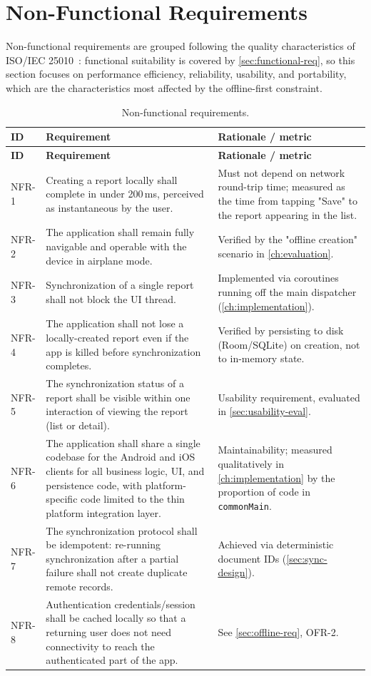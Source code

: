 \section{Non-Functional Requirements}
\label{sec:nonfunctional-req}

Non-functional requirements are grouped following the quality
characteristics of ISO/IEC 25010~\cite{iso25010}: functional suitability
is covered by \cref{sec:functional-req}, so this section focuses on
performance efficiency, reliability, usability, and portability, which are
the characteristics most affected by the offline-first constraint.

\begin{longtable}{@{}p{1.4cm}p{5.4cm}p{5.0cm}@{}}
\caption{Non-functional requirements.}
\label{tab:nonfunctional-req}\\
\toprule
\textbf{ID} & \textbf{Requirement} & \textbf{Rationale / metric} \\
\midrule
\endfirsthead
\toprule
\textbf{ID} & \textbf{Requirement} & \textbf{Rationale / metric} \\
\midrule
\endhead
NFR-1 & Creating a report locally shall complete in under 200\,ms,
perceived as instantaneous by the user. & Must not depend on network
round-trip time; measured as the time from tapping "Save" to the report
appearing in the list. \\
NFR-2 & The application shall remain fully navigable and operable with the
device in airplane mode. & Verified by the "offline creation" scenario in
\cref{ch:evaluation}. \\
NFR-3 & Synchronization of a single report shall not block the UI thread.
& Implemented via coroutines running off the main dispatcher
(\cref{ch:implementation}). \\
NFR-4 & The application shall not lose a locally-created report even if
the app is killed before synchronization completes. & Verified by
persisting to disk (Room/SQLite) on creation, not to in-memory state. \\
NFR-5 & The synchronization status of a report shall be visible within
one interaction of viewing the report (list or detail). & Usability
requirement, evaluated in \cref{sec:usability-eval}. \\
NFR-6 & The application shall share a single codebase for the Android and
iOS clients for all business logic, UI, and persistence code, with
platform-specific code limited to the thin platform integration layer. &
Maintainability; measured qualitatively in \cref{ch:implementation} by the
proportion of code in \texttt{commonMain}. \\
NFR-7 & The synchronization protocol shall be idempotent: re-running
synchronization after a partial failure shall not create duplicate remote
records. & Achieved via deterministic document IDs
(\cref{sec:sync-design}). \\
NFR-8 & Authentication credentials/session shall be cached locally so
that a returning user does not need connectivity to reach the
authenticated part of the app. & See \cref{sec:offline-req}, OFR-2. \\
\bottomrule
\end{longtable}

